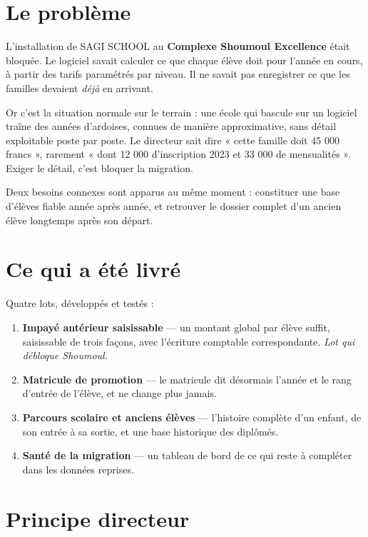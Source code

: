 \documentclass[11pt,a4paper]{report}
\begin{document}
\section*{Le problème}

L'installation de SAGI SCHOOL au \textbf{Complexe Shoumoul Excellence} était
bloquée. Le logiciel savait calculer ce que chaque élève doit pour l'année en
cours, à partir des tarifs paramétrés par niveau. Il ne savait pas enregistrer
ce que les familles devaient \emph{déjà} en arrivant.

Or c'est la situation normale sur le terrain : une école qui bascule sur un
logiciel traîne des années d'ardoises, connues de manière approximative, sans
détail exploitable poste par poste. Le directeur sait dire « cette famille doit
45 000 francs », rarement « dont 12 000 d'inscription 2023 et 33 000 de
mensualités ». Exiger le détail, c'est bloquer la migration.

Deux besoins connexes sont apparus au même moment : constituer une base
d'élèves fiable année après année, et retrouver le dossier complet d'un ancien
élève longtemps après son départ.

\section*{Ce qui a été livré}

Quatre lots, développés et testés :

\begin{enumerate}
\item \textbf{Impayé antérieur saisissable} --- un montant global par élève
      suffit, saisissable de trois façons, avec l'écriture comptable
      correspondante. \emph{Lot qui débloque Shoumoul.}
\item \textbf{Matricule de promotion} --- le matricule dit désormais l'année
      et le rang d'entrée de l'élève, et ne change plus jamais.
\item \textbf{Parcours scolaire et anciens élèves} --- l'histoire complète d'un
      enfant, de son entrée à sa sortie, et une base historique des diplômés.
\item \textbf{Santé de la migration} --- un tableau de bord de ce qui reste à
      compléter dans les données reprises.
\end{enumerate}

\section*{Principe directeur}
\end{document}
